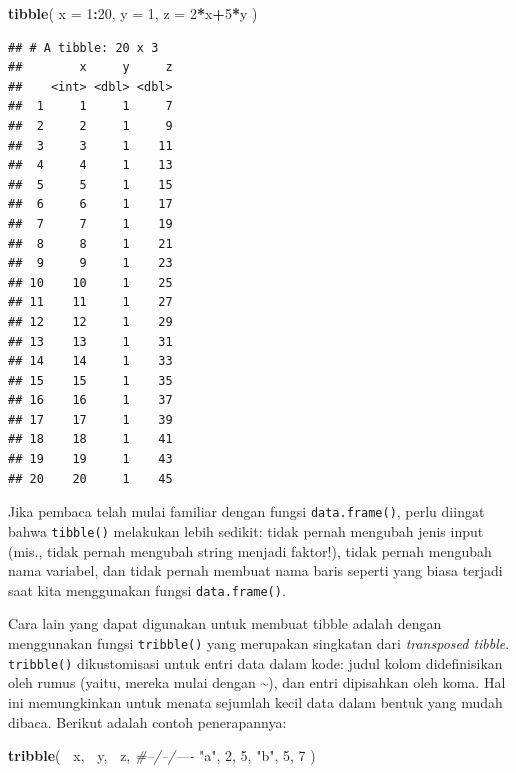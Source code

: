 \documentclass[]{book}
\newenvironment{Shaded}{\begin{snugshade}}{\end{snugshade}}
\newcommand{\KeywordTok}[1]{\textcolor[rgb]{0.13,0.29,0.53}{\textbf{#1}}}
\newcommand{\DataTypeTok}[1]{\textcolor[rgb]{0.13,0.29,0.53}{#1}}
\newcommand{\DecValTok}[1]{\textcolor[rgb]{0.00,0.00,0.81}{#1}}
\newcommand{\StringTok}[1]{\textcolor[rgb]{0.31,0.60,0.02}{#1}}
\newcommand{\CommentTok}[1]{\textcolor[rgb]{0.56,0.35,0.01}{\textit{#1}}}
\newcommand{\OperatorTok}[1]{\textcolor[rgb]{0.81,0.36,0.00}{\textbf{#1}}}
\newcommand{\NormalTok}[1]{#1}
\begin{document}
\begin{Shaded}
\begin{Highlighting}[]
\KeywordTok{tibble}\NormalTok{(}
  \DataTypeTok{x =} \DecValTok{1}\OperatorTok{:}\DecValTok{20}\NormalTok{,}
  \DataTypeTok{y =} \DecValTok{1}\NormalTok{,}
  \DataTypeTok{z =} \DecValTok{2}\OperatorTok{*}\NormalTok{x}\OperatorTok{+}\DecValTok{5}\OperatorTok{*}\NormalTok{y}
\NormalTok{)}
\end{Highlighting}
\end{Shaded}

\begin{verbatim}
## # A tibble: 20 x 3
##        x     y     z
##    <int> <dbl> <dbl>
##  1     1     1     7
##  2     2     1     9
##  3     3     1    11
##  4     4     1    13
##  5     5     1    15
##  6     6     1    17
##  7     7     1    19
##  8     8     1    21
##  9     9     1    23
## 10    10     1    25
## 11    11     1    27
## 12    12     1    29
## 13    13     1    31
## 14    14     1    33
## 15    15     1    35
## 16    16     1    37
## 17    17     1    39
## 18    18     1    41
## 19    19     1    43
## 20    20     1    45
\end{verbatim}

Jika pembaca telah mulai familiar dengan fungsi \texttt{data.frame()},
perlu diingat bahwa \texttt{tibble()} melakukan lebih sedikit: tidak
pernah mengubah jenis input (mis., tidak pernah mengubah string menjadi
faktor!), tidak pernah mengubah nama variabel, dan tidak pernah membuat
nama baris seperti yang biasa terjadi saat kita menggunakan fungsi
\texttt{data.frame()}.

Cara lain yang dapat digunakan untuk membuat tibble adalah dengan
menggunakan fungsi \texttt{tribble()} yang merupakan singkatan dari
\emph{transposed tibble}. \texttt{tribble()} dikustomisasi untuk entri
data dalam kode: judul kolom didefinisikan oleh rumus (yaitu, mereka
mulai dengan \textasciitilde{}), dan entri dipisahkan oleh koma. Hal ini
memungkinkan untuk menata sejumlah kecil data dalam bentuk yang mudah
dibaca. Berikut adalah contoh penerapannya:

\begin{Shaded}
\begin{Highlighting}[]
\KeywordTok{tribble}\NormalTok{(}
  \OperatorTok{~}\NormalTok{x, }\OperatorTok{~}\NormalTok{y, }\OperatorTok{~}\NormalTok{z,}
  \CommentTok{#--/--/----}
  \StringTok{"a"}\NormalTok{, }\DecValTok{2}\NormalTok{, }\DecValTok{5}\NormalTok{,}
  \StringTok{"b"}\NormalTok{, }\DecValTok{5}\NormalTok{, }\DecValTok{7}
\NormalTok{)}
\end{Highlighting}
\end{Shaded}
\end{document}
